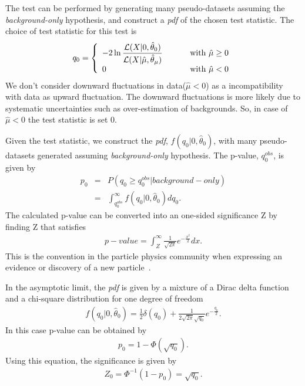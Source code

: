 The test can be performed by generating many pseudo-datasets assuming the 
\textit{background-only} hypothesis, and construct a \textit{pdf} 
of the chosen test statistic. The choice of test statistic for 
this test is  
\begin{eqnarray} 
q_0
=
\left\{ \begin{array}{l l}
\displaystyle
-2 \ln \frac{\mathcal{L}( X | 0, \hat{\theta}_0)}
            {\mathcal{L}( X | \hat{\mu}, \hat{\theta}_\mu)} 
             & \qquad \textrm{ with } \hat{\mu} \ge 0 \\   
0 
             & \qquad \textrm{ with } \hat{\mu} < 0    
\end{array} \right.
\end{eqnarray} 
We don't consider downward fluctuations in data($\hat{\mu} < 0$) as a 
incompatibility with data as upward fluctuation. The downward fluctuations 
is more likely due to systematic uncertainties such as over-estimation 
of backgrounds. So, in case of $\hat{\mu} < 0$ the test statistic is 
set 0. 

Given the test statistic, we construct the \textit{pdf}, $f(q_0|0,\hat{\theta}_0)$, 
with many pseudo-datasets generated assuming \textit{background-only} hypothesis.
The p-value, $q_0^{obs}$, is given by 
\begin{eqnarray} 
p_0
&=& P \left( q_0 \ge q_0^{obs} | background-only \right)  \\
&=& \int^{\infty}_{ q_0^{obs} }  f\left( q_0 | 0, \hat{\theta}_0 \right) dq_0.
\end{eqnarray} 
The calculated p-value can be converted into an one-sided%
significance Z by finding Z that satisfies 
\begin{eqnarray} 
p-value 
= 
\int^{\infty}_{Z} \frac{1}{\sqrt{2\pi}} e^{ -\frac{x^2}{2}} dx.   
\end{eqnarray} 
This is the convention in the particle physics community 
when expressing an evidence or discovery of a new particle~\cite{Beringer:1900zz}.

In the asymptotic limit, the \textit{pdf} is given by a mixture of 
a Dirac delta function and a chi-square distribution for one 
degree of freedom~\cite{combination_stat}
\begin{eqnarray} 
f\left(q_0 | 0, \hat{\theta}_0 \right) 
= 
\frac{1}{2} \delta \left(q_0\right)  
+ 
\frac{1}{2\sqrt{2\pi}\sqrt{q_0}} e^{-\frac{q_0}{2}}.
\end{eqnarray}
In this case p-value can be obtained by 
\begin{eqnarray}
p_0 = 1 - \Phi \left( \sqrt{q_0} \right).
\end{eqnarray} 
Using this equation, the significance is given by  
\begin{eqnarray} 
Z_0 = \Phi^{-1} \left( 1 - p_0 \right) = \sqrt{q_0}.
\end{eqnarray} 

